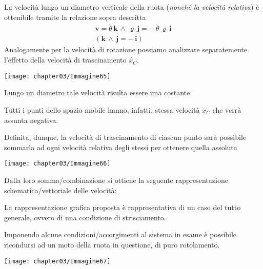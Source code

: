 \begin{minipage}{.7\textwidth}
La velocità lungo un diametro verticale della ruota (\emph{nonché la velocità relativa}) è ottenibile tramite la relazione sopra descritta 
\begin{gather*}
\mathbf{v}= \dot{\theta}\,\mathbf{k}\,\wedge\,\varrho\,\mathbf{j} = -\,\dot{\theta}\,\varrho\,\mathbf{i}\\
(\mathbf{k}\,\wedge\,\mathbf{j}=-\,\mathbf{i})
\end{gather*}
		Analogamente per la velocità di rotazione possiamo analizzare separatemente l'effetto della velocità di trascinamento $\dot{x_C}$.
\end{minipage}
\hfill
\begin{minipage}{.3\textwidth}
\centering
\texttt{[image: chapter03/Immagine65]}
\end{minipage}

\begin{minipage}{.7\textwidth}
		Lungo un diametro tale velocità risulta essere una costante.
		
		Tutti i punti dello spazio mobile hanno, infatti, stessa velocità $\dot{x_C}$ che verrà assunta negativa.\newline
		
		Definita, dunque, la velocità di trascinamento di ciascun punto sarà possibile sommarla ad ogni velocità relativa degli stessi per ottenere quella assoluta
		\end{minipage}
		\hfill
		\begin{minipage}{.3\textwidth}
		\centering
		\texttt{[image: chapter03/Immagine66]}
		\end{minipage}

			
		\begin{minipage}{.7\textwidth}		
		Dalla loro somma/combinazione si ottiene la seguente rappresentazione schematica/vettoriale delle velocità:

		La rappresentazione grafica proposta è rappresentativa di un caso del tutto generale, ovvero di una condizione di strisciamento.
		
		Imponendo alcune condizioni/accorgimenti al sistema in esame è possibile ricondursi ad un moto della ruota in questione, di puro rotolamento.
		\end{minipage}
		\hfill
		\begin{minipage}{.3\textwidth}
		\centering
		\texttt{[image: chapter03/Immagine67]}
		\end{minipage}
		
